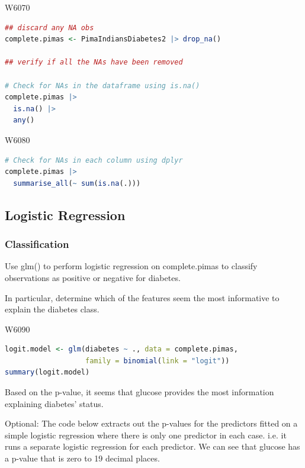 
\begin{ocg}{}{W607}{0}
\begin{lstlisting}[language = R]
## discard any NA obs
complete.pimas <- PimaIndiansDiabetes2 |> drop_na()

## verify if all the NAs have been removed 

# Check for NAs in the dataframe using is.na()
complete.pimas |>
  is.na() |>
  any()
\end{lstlisting}
\end{ocg}


\begin{ocg}{}{W608}{0}
\begin{lstlisting}[language = R]
# Check for NAs in each column using dplyr
complete.pimas |> 
  summarise_all(~ sum(is.na(.)))
\end{lstlisting}
\end{ocg}

\subsection{Logistic Regression}

\subsubsection{Classification}

\indent 

Use glm() to perform logistic regression on complete.pimas to classify observations as positive or negative for diabetes.

In particular, determine which of the features seem the most informative to explain the diabetes class.


\begin{ocg}{}{W609}{0}
\begin{lstlisting}[language = R]
logit.model <- glm(diabetes ~ ., data = complete.pimas,
                   family = binomial(link = "logit"))
summary(logit.model)
\end{lstlisting}
\end{ocg}

Based on the p-value, it seems that glucose provides the most information explaining diabetes’ status.

Optional: The code below extracts out the p-values for the predictors fitted on a simple logistic regression where there is only one predictor in each case. i.e. it runs a separate logistic regression for each predictor. We can see that glucose has a p-value that is zero to 19 decimal places.

